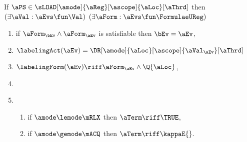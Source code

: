 \begin{figure}
  \noindent
  If $\aPS \in \sLOAD[\amode]{\aReg}[\ascope]{\aLoc}[\aThrd]$ then
  $(\exists\aVal:\aEvs\fun\Val)$
  $(\exists\aForm:\aEvs\fun\FormulaeUReg)$
  \begin{multicols}{2}
    \begin{enumerate}[topsep=0pt,label=(\textsc{r}\arabic*),ref=\textsc{r}\arabic*]
    \item \label{read-E-ca}
      if $\aForm_\bEv\land\aForm_\aEv$ is satisfiable then $\bEv=\aEv$,
    \item \label{read-lambda-ca}
      $\labelingAct(\aEv) = \DR[\amode]{\aLoc}[\ascope]{\aVal_\aEv}[\aThrd]$
    \item \label{read-kappa-ca}
      \begin{math}
        \labelingForm(\aEv) \riff
        \aForm_\aEv
        \land
        \Q{\aLoc}
      \end{math},
    \item \label{read-tau-ca}

      \columnbreak
    \item[] 
      \begin{enumerate}[leftmargin=0pt]
      \item \label{read-term-nonempty-ca}
        if $\amode\lemode\mRLX$ then $\aTerm \riff \TRUE$,
      \item \label{read-term-empty-ca}
        if $\amode\gemode\mACQ$ then
        \begin{math}
          \aTerm \riff
          \kappaE{}.
        \end{math}
      \end{enumerate}      
    \end{enumerate}
  \end{multicols}
  \medskip



\end{figure}
